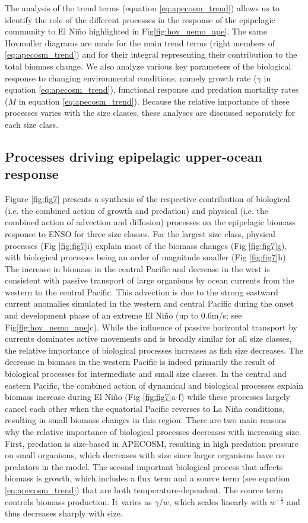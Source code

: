 The analysis of the trend terms (equation \ref{eq:apecosm_trend}) allows us to identify the role of the different processes in the response of the epipelagic community to El Niño highlighted in Fig\ref{fig:hov_nemo_ape}. The same Hovmuller diagrams are made for the main trend terms (right members of \ref{eq:apecosm_trend}) and for their integral representing their contribution to the total biomass change. We also analyze various key parameters of the biological response to changing environmental conditions, namely growth rate ($\gamma$ in equation \ref{eq:apecosm_trend}), functional response and predation mortality rates ($M$ in equation \ref{eq:apecosm_trend}). Because the relative importance of these processes varies with the size classes, these analyses are discussed separately for each size class.

\subsection{Processes driving epipelagic upper-ocean response}

Figure \ref{fig:fig7} presents a synthesis of the respective contribution of biological (i.e. the combined action of growth and predation) and physical (i.e. the combined action of advection and diffusion) processes on the epipelagic biomass response to ENSO for three size classes. For the largest size class, physical processes (Fig \ref{fig:fig7}i) explain most of the biomass changes (Fig \ref{fig:fig7}g), with biological processes being an order of magnitude smaller (Fig \ref{fig:fig7}h). The increase in biomass in the central Pacific and decrease in the west is consistent with passive transport of large organisms by ocean currents from the western to the central Pacific. This advection is due to the strong eastward current anomalies simulated in the western and central Pacific during the onset and development phase of an extreme El Niño (up to 0.6m/s; see Fig\ref{fig:hov_nemo_ape}c). While the influence of passive horizontal transport by currents dominates active movements and is broadly similar for all size classes, the relative importance of biological processes increases as fish size decreases. The decrease in biomass in the western Pacific is indeed primarily the result of biological processes for intermediate and small size classes. In the central and eastern Pacific, the combined action of dynamical and biological processes explain biomass increase during El Niño (Fig \ref{fig:fig7}a-f) while these processes largely cancel each other when the equatorial Pacific reverses to La Niña conditions, resulting in small biomass changes in this region. There are two main reasons why the relative importance of biological processes decreases with increasing size. First, predation is size-based in APECOSM, resulting in high predation pressure on small organisms, which decreases with size since larger organisms have no predators in the model. The second important biological process that affects biomass is growth, which includes a flux term and a source term (see equation \ref{eq:apecosm_trend}) that are both temperature-dependent. The source term controls biomass production. It varies as ${\gamma}/{w}$, which scales linearly with $w^{-\frac{1}{3}}$ and thus decreases sharply with size.


